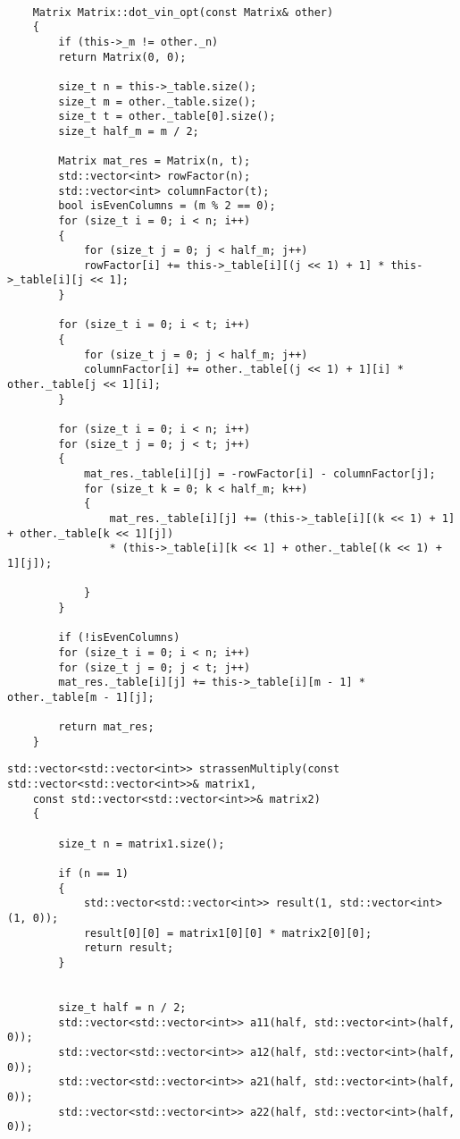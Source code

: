 \begin{appendices}
	\begin{lstlisting}[label=lst:strassen,caption=Реализация алгоритма расчета произведения матриц Штрассена]
	
	Matrix Matrix::dot_vin_opt(const Matrix& other)
	{
		if (this->_m != other._n)
		return Matrix(0, 0);
		
		size_t n = this->_table.size();
		size_t m = other._table.size();
		size_t t = other._table[0].size();
		size_t half_m = m / 2;
		
		Matrix mat_res = Matrix(n, t);
		std::vector<int> rowFactor(n);
		std::vector<int> columnFactor(t);
		bool isEvenColumns = (m % 2 == 0);
		for (size_t i = 0; i < n; i++)
		{
			for (size_t j = 0; j < half_m; j++)
			rowFactor[i] += this->_table[i][(j << 1) + 1] * this->_table[i][j << 1];
		}
		
		for (size_t i = 0; i < t; i++)
		{
			for (size_t j = 0; j < half_m; j++)
			columnFactor[i] += other._table[(j << 1) + 1][i] * other._table[j << 1][i];
		}
		
		for (size_t i = 0; i < n; i++)
		for (size_t j = 0; j < t; j++)
		{
			mat_res._table[i][j] = -rowFactor[i] - columnFactor[j];
			for (size_t k = 0; k < half_m; k++)
			{
				mat_res._table[i][j] += (this->_table[i][(k << 1) + 1] + other._table[k << 1][j])
				* (this->_table[i][k << 1] + other._table[(k << 1) + 1][j]);
				
			}
		}
		
		if (!isEvenColumns)
		for (size_t i = 0; i < n; i++)
		for (size_t j = 0; j < t; j++)
		mat_res._table[i][j] += this->_table[i][m - 1] * other._table[m - 1][j];
		
		return mat_res;
	}
	\end{lstlisting}
	
	\begin{lstlisting}[label=lst:stras,caption=Реализация алгоритма расчета произведения матриц Винограда с оптимизациями]
	std::vector<std::vector<int>> strassenMultiply(const std::vector<std::vector<int>>& matrix1,
	const std::vector<std::vector<int>>& matrix2)
	{
		
		size_t n = matrix1.size();
		
		if (n == 1)
		{
			std::vector<std::vector<int>> result(1, std::vector<int>(1, 0));
			result[0][0] = matrix1[0][0] * matrix2[0][0];
			return result;
		}
		
		
		size_t half = n / 2;
		std::vector<std::vector<int>> a11(half, std::vector<int>(half, 0));
		std::vector<std::vector<int>> a12(half, std::vector<int>(half, 0));
		std::vector<std::vector<int>> a21(half, std::vector<int>(half, 0));
		std::vector<std::vector<int>> a22(half, std::vector<int>(half, 0));
		

\end{lstlisting}
\end{appendices}
